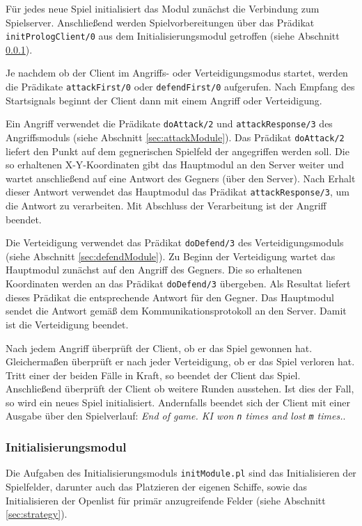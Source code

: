 	Für jedes neue Spiel initialisiert das Modul zunächst die Verbindung zum
	Spielserver. Anschließend werden Spielvorbereitungen über das Prädikat \texttt{initPrologClient/0} aus dem 
	Initialisierungsmodul getroffen (siehe Abschnitt \ref{sec:initModule}).
	
	Je nachdem ob der Client im Angriffs- oder Verteidigungsmodus startet, werden die Prädikate \texttt{attackFirst/0} oder
	\texttt{defendFirst/0} aufgerufen. Nach Empfang des Startsignals beginnt der Client dann mit einem Angriff oder Verteidigung.
	
	Ein Angriff verwendet die Prädikate \texttt{doAttack/2} und \texttt{attackResponse/3} des Angriffsmoduls (siehe Abschnitt
	\ref{sec:attackModule}).
	Das Prädikat \texttt{doAttack/2} liefert den Punkt auf dem gegnerischen Spielfeld der angegriffen werden soll.
	Die so erhaltenen X-Y-Koordinaten gibt das Hauptmodul an den Server weiter und wartet anschließend auf eine Antwort des 
	Gegners (über den Server). 
	Nach Erhalt dieser Antwort verwendet das Hauptmodul das Prädikat \texttt{attackResponse/3}, um die Antwort zu verarbeiten.
	Mit Abschluss der Verarbeitung ist der Angriff beendet.
	
	Die Verteidigung verwendet das Prädikat \texttt{doDefend/3} des Verteidigungsmoduls (siehe Abschnitt \ref{sec:defendModule}).
	Zu Beginn der Verteidigung wartet das Hauptmodul zunächst auf den Angriff des Gegners. Die so erhaltenen Koordinaten
	werden an das Prädikat \texttt{doDefend/3} übergeben. Als Resultat liefert dieses Prädikat die entsprechende Antwort für den
	Gegner. Das Hauptmodul sendet die Antwort gemäß dem Kommunikationsprotokoll an den Server. Damit ist die Verteidigung 
	beendet.
	
	Nach jedem Angriff überprüft der Client, ob er das Spiel gewonnen hat. Gleichermaßen überprüft er nach jeder Verteidigung, 
	ob er das Spiel verloren hat. Tritt einer der beiden Fälle in Kraft, so beendet der Client das Spiel. 
	Anschließend überprüft der Client ob weitere Runden ausstehen. Ist dies der Fall, so wird ein neues Spiel initialisiert.
	Andernfalls beendet sich der Client mit einer Ausgabe über den Spielverlauf:
	\textit{End of game. KI won \texttt{n} times and lost \texttt{m} times.}.

\subsubsection{Initialisierungsmodul} \label{sec:initModule}
	Die Aufgaben des Initialisierungsmoduls \texttt{initModule.pl} sind das Initialisieren der Spielfelder, darunter auch
	das Platzieren der eigenen Schiffe, sowie das Initialisieren der Openlist für primär anzugreifende Felder (siehe Abschnitt \ref{sec:strategy}).
	
